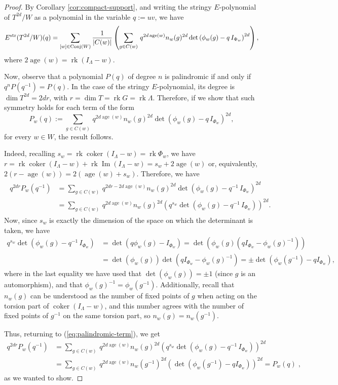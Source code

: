\documentclass[11pt,english]{amsart}
\numberwithin{equation}{section}
\numberwithin{figure}{section}
\theoremstyle{plain}
\theoremstyle{plain}
\theoremstyle{definition}
\theoremstyle{remark}
\DeclareMathOperator{\image}{Im}
\newcommand{\coker}{\operatorname{coker}}
\newcommand{\rk}{\operatorname{rk}}
\newcommand{\age}{\operatorname{age}}
\newcommand{\str}{\textup{str}}
\begin{document}
\begin{proof}
By Corollary \ref{cor:compact-support}, and writing the stringy $E$-polynomial of $T^{2d}/W$ as a polynomial in the variable $q := uv$, we have
    \[
        E^{\str}(T^{2d}/W)(q)=\sum_{[w] \in \textup{Conj}(W)}
        \frac{1}{|C(w)|}\left(\sum_{g \in C(w)} \, q^{2d\age(w)}n_{w}(g)^{2d} \det\left(\phi_w(g)-q\,I_{\Phi_w}\right)^{2d} \right),
    \]
where $2\age(w) = \rk(I_\Lambda - w)$.

Now, observe that a polynomial $P(q)$ of degree $n$ is palindromic if and only if $q^nP(q^{-1})= P(q)$. In the case of the stringy $E$-polynomial, its degree is $\dim T^{2d} = 2dr$, with $r = \dim T = \rk G=\rk \Lambda$. Therefore, if we show that such symmetry holds for each term of the form
$$
P_w(q) := \sum_{g \in C(w)} \, q^{2d\age(w)}n_{w}(g)^{2d} \det\left(\phi_w(g)-q\,I_{\Phi_w}\right)^{2d},
$$
for every $w \in W$, the result follows.

Indeed, recalling $s_w = \rk \coker(I_{\Lambda} - w) = \rk \Phi_w$, we have $r = \rk \coker(I_{\Lambda} - w) + \rk \image(I_{\Lambda} - w) = s_w + 2\age(w)$ or, equivalently, $2(r - \age(w)) = 2(\age(w) + s_w)$. Therefore, we have
\begin{align}
\begin{split}\label{eq:palindromic-term}
q^{2dr}P_w(q^{-1}) & = \sum_{g \in C(w)} \, q^{2dr-2d\age(w)}n_{w}(g)^{2d} \det\left(\phi_w(g)-q^{-1}\,I_{\Phi_w}\right)^{2d} \\
& = \sum_{g \in C(w)} \, q^{2d\age(w)}n_{w}(g)^{2d} \left(q^{s_w}\det\left(\phi_w(g)-q^{-1}\,I_{\Phi_w}\right)\right)^{2d}.
\end{split}
\end{align}
Now, since $s_w$ is exactly the dimension of the space on which the determinant is taken, we have
\begin{align*}
q^{s_w}\det\left(\phi_w(g)-q^{-1}\,I_{\Phi_w}\right) & = \det\left(q\phi_w(g)-I_{\Phi_w}\right) = \det\left(\phi_w(g)(qI_{\Phi_w}-\phi_w(g)^{-1})\right) \\
& = \det(\phi_w(g)) \det\left(qI_{\Phi_w}-\phi_w(g)^{-1}\right) = \pm \det\left(\phi_w(g^{-1}) - qI_{\Phi_w}\right),
\end{align*}
where in the last equality we have used that $\det(\phi_w(g)) = \pm1$ (since $g$ is an automorphism), and that $\phi_w(g)^{-1} = \phi_w(g^{-1})$. Additionally, recall that $n_w(g)$ can be understood as the number of fixed points of $g$ when acting on the torsion part of $\coker(I_\Lambda - w)$, and this number agrees with the number of fixed points of $g^{-1}$ on the same torsion part, so $n_w(g)= n_w(g^{-1})$.

Thus, returning to (\ref{eq:palindromic-term}), we get
\begin{align*}
q^{2dr}P_w(q^{-1}) & = \sum_{g \in C(w)} \, q^{2d\age(w)}n_{w}(g)^{2d} \left(q^{s_w}\det\left(\phi_w(g)-q^{-1}\,I_{\Phi_w}\right)\right)^{2d} \\
& = \sum_{g \in C(w)} \, q^{2d\age(w)}n_{w}(g^{-1})^{2d} \left(\det\left(\phi_w(g^{-1}) - qI_{\Phi_w}\right)\right)^{2d} = P_w(q)\; ,
\end{align*}
as we wanted to show.
\end{proof}
\end{document}
